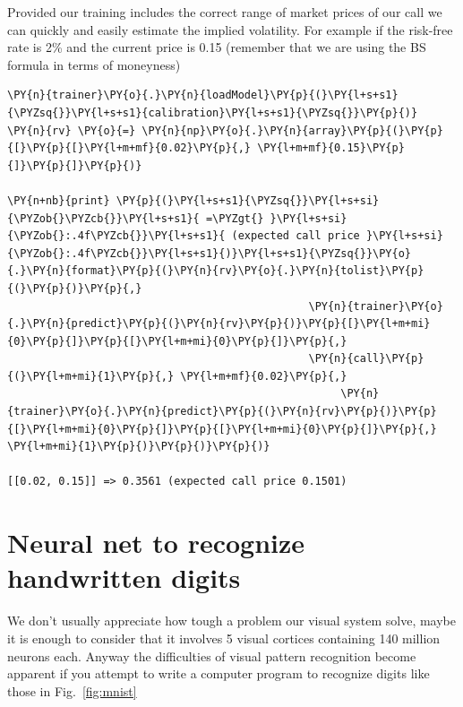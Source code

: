 Provided our training includes the correct range of market prices of our
call we can quickly and easily estimate the implied volatility. For
example if the risk-free rate is 2\% and the current price is 0.15
(remember that we are using the BS formula in terms of moneyness)

\begin{tcolorbox}[breakable, size=fbox, boxrule=1pt, pad at break*=1mm,colback=cellbackground, colframe=cellborder]
\begin{Verbatim}[commandchars=\\\{\}]
\PY{n}{trainer}\PY{o}{.}\PY{n}{loadModel}\PY{p}{(}\PY{l+s+s1}{\PYZsq{}}\PY{l+s+s1}{calibration}\PY{l+s+s1}{\PYZsq{}}\PY{p}{)}
\PY{n}{rv} \PY{o}{=} \PY{n}{np}\PY{o}{.}\PY{n}{array}\PY{p}{(}\PY{p}{[}\PY{p}{[}\PY{l+m+mf}{0.02}\PY{p}{,} \PY{l+m+mf}{0.15}\PY{p}{]}\PY{p}{]}\PY{p}{)}
	
\PY{n+nb}{print} \PY{p}{(}\PY{l+s+s1}{\PYZsq{}}\PY{l+s+si}{\PYZob{}\PYZcb{}}\PY{l+s+s1}{ =\PYZgt{} }\PY{l+s+si}{\PYZob{}:.4f\PYZcb{}}\PY{l+s+s1}{ (expected call price }\PY{l+s+si}{\PYZob{}:.4f\PYZcb{}}\PY{l+s+s1}{)}\PY{l+s+s1}{\PYZsq{}}\PY{o}{.}\PY{n}{format}\PY{p}{(}\PY{n}{rv}\PY{o}{.}\PY{n}{tolist}\PY{p}{(}\PY{p}{)}\PY{p}{,} 
                                               \PY{n}{trainer}\PY{o}{.}\PY{n}{predict}\PY{p}{(}\PY{n}{rv}\PY{p}{)}\PY{p}{[}\PY{l+m+mi}{0}\PY{p}{]}\PY{p}{[}\PY{l+m+mi}{0}\PY{p}{]}\PY{p}{,} 
                                               \PY{n}{call}\PY{p}{(}\PY{l+m+mi}{1}\PY{p}{,} \PY{l+m+mf}{0.02}\PY{p}{,} 
                                                    \PY{n}{trainer}\PY{o}{.}\PY{n}{predict}\PY{p}{(}\PY{n}{rv}\PY{p}{)}\PY{p}{[}\PY{l+m+mi}{0}\PY{p}{]}\PY{p}{[}\PY{l+m+mi}{0}\PY{p}{]}\PY{p}{,} \PY{l+m+mi}{1}\PY{p}{)}\PY{p}{)}\PY{p}{)}

[[0.02, 0.15]] => 0.3561 (expected call price 0.1501)
\end{Verbatim}
\end{tcolorbox}

\section{Neural net to recognize handwritten
		digits}\label{neural-net-to-recognize-handwritten-digits}

We don't usually appreciate how tough a problem our visual system solve,
maybe it is enough to consider that it involves 5 visual cortices
containing 140 million neurons each. Anyway the difficulties of visual
pattern recognition become apparent if you attempt to write a computer
program to recognize digits like those in Fig.~\ref{fig:mnist}

